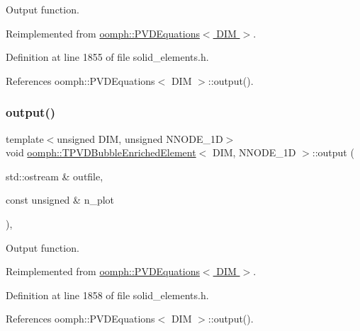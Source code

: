 Output function. 



Reimplemented from \hyperlink{classoomph_1_1PVDEquations_ab9e919921934cfe7433420bd2e4482f5}{oomph\+::\+P\+V\+D\+Equations$<$ D\+I\+M $>$}.



Definition at line 1855 of file solid\+\_\+elements.\+h.



References oomph\+::\+P\+V\+D\+Equations$<$ D\+I\+M $>$\+::output().

\mbox{\label{classoomph_1_1TPVDBubbleEnrichedElement_a88ae1b66e5b6ca42c88046f615632c0a}} 
\subsubsection{\texorpdfstring{output()}{output()}\hspace{0.1cm}{\footnotesize\ttfamily [2/4]}}
{\footnotesize\ttfamily template$<$unsigned D\+IM, unsigned N\+N\+O\+D\+E\+\_\+1D$>$ \\
void \hyperlink{classoomph_1_1TPVDBubbleEnrichedElement}{oomph\+::\+T\+P\+V\+D\+Bubble\+Enriched\+Element}$<$ D\+IM, N\+N\+O\+D\+E\+\_\+1D $>$\+::output (\begin{DoxyParamCaption}\item[{std\+::ostream \&}]{outfile,  }\item[{const unsigned \&}]{n\+\_\+plot }\end{DoxyParamCaption})\hspace{0.3cm}{\ttfamily [inline]}, {\ttfamily [virtual]}}



Output function. 



Reimplemented from \hyperlink{classoomph_1_1PVDEquations_a5e3a09d059ced1ee9f9e1a7923171ab7}{oomph\+::\+P\+V\+D\+Equations$<$ D\+I\+M $>$}.



Definition at line 1858 of file solid\+\_\+elements.\+h.



References oomph\+::\+P\+V\+D\+Equations$<$ D\+I\+M $>$\+::output().

